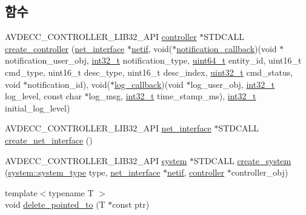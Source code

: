 \subsection*{함수}
\begin{DoxyCompactItemize}
\item 
A\+V\+D\+E\+C\+C\+\_\+\+C\+O\+N\+T\+R\+O\+L\+L\+E\+R\+\_\+\+L\+I\+B32\+\_\+\+A\+PI \hyperlink{classavdecc__lib_1_1controller}{controller} $\ast$S\+T\+D\+C\+A\+LL \hyperlink{namespaceavdecc__lib_a9522ca527ff16c193dee108070bb049d}{create\+\_\+controller} (\hyperlink{classavdecc__lib_1_1net__interface}{net\+\_\+interface} $\ast$\hyperlink{structnetif}{netif}, void($\ast$\hyperlink{notification__main_8cpp_a0ac846a129e0f5cc0f199a57f19dcdf0}{notification\+\_\+callback})(void $\ast$notification\+\_\+user\+\_\+obj, \hyperlink{parse_8c_a37994e3b11c72957c6f454c6ec96d43d}{int32\+\_\+t} notification\+\_\+type, \hyperlink{parse_8c_aec6fcb673ff035718c238c8c9d544c47}{uint64\+\_\+t} entity\+\_\+id, uint16\+\_\+t cmd\+\_\+type, uint16\+\_\+t desc\+\_\+type, uint16\+\_\+t desc\+\_\+index, \hyperlink{parse_8c_a6eb1e68cc391dd753bc8ce896dbb8315}{uint32\+\_\+t} cmd\+\_\+status, void $\ast$notification\+\_\+id), void($\ast$\hyperlink{log__main_8cpp_ada1b24c3a6e3b693689b6af49d269216}{log\+\_\+callback})(void $\ast$log\+\_\+user\+\_\+obj, \hyperlink{parse_8c_a37994e3b11c72957c6f454c6ec96d43d}{int32\+\_\+t} log\+\_\+level, const char $\ast$log\+\_\+msg, \hyperlink{parse_8c_a37994e3b11c72957c6f454c6ec96d43d}{int32\+\_\+t} time\+\_\+stamp\+\_\+ms), \hyperlink{parse_8c_a37994e3b11c72957c6f454c6ec96d43d}{int32\+\_\+t} initial\+\_\+log\+\_\+level)
\item 
A\+V\+D\+E\+C\+C\+\_\+\+C\+O\+N\+T\+R\+O\+L\+L\+E\+R\+\_\+\+L\+I\+B32\+\_\+\+A\+PI \hyperlink{classavdecc__lib_1_1net__interface}{net\+\_\+interface} $\ast$S\+T\+D\+C\+A\+LL \hyperlink{namespaceavdecc__lib_a8b336b65d90693b2467da09648f6fc6f}{create\+\_\+net\+\_\+interface} ()
\item 
A\+V\+D\+E\+C\+C\+\_\+\+C\+O\+N\+T\+R\+O\+L\+L\+E\+R\+\_\+\+L\+I\+B32\+\_\+\+A\+PI \hyperlink{classavdecc__lib_1_1system}{system} $\ast$S\+T\+D\+C\+A\+LL \hyperlink{namespaceavdecc__lib_a4d54d2caf01ccf128cb9e0ce14273504}{create\+\_\+system} (\hyperlink{classavdecc__lib_1_1system_aacdda6e9ef910c6762dd50aefd8ee5bb}{system\+::system\+\_\+type} type, \hyperlink{classavdecc__lib_1_1net__interface}{net\+\_\+interface} $\ast$\hyperlink{structnetif}{netif}, \hyperlink{classavdecc__lib_1_1controller}{controller} $\ast$controller\+\_\+obj)
\item 
{\footnotesize template$<$typename T $>$ }\\void \hyperlink{namespaceavdecc__lib_ad22328551cbe81764f732c13080dd38c}{delete\+\_\+pointed\+\_\+to} (T $\ast$const ptr)

\end{DoxyCompactItemize}
